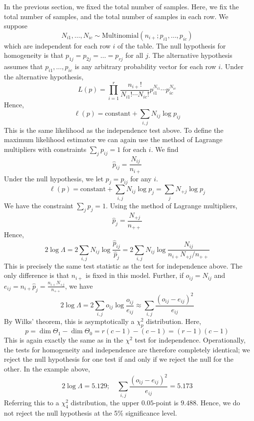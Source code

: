 \begin{example}
	In the previous section, we fixed the total number of samples.
	Here, we fix the total number of samples, and the total number of samples in each row.
	We suppose
	\[
		N_{i1}, \dots, N_{ic} \sim \mathrm{Multinomial}(n_{i+}; p_{i1}, \dots, p_{ic})
	\]
	which are independent for each row \( i \) of the table.
	The null hypothesis for homogeneity is that \( p_{1j} = p_{2j} = \dots = p_{rj} \) for all \( j \).
	The alternative hypothesis assumes that \( p_{i1}, \dots, p_{ic} \) is any arbitrary probability vector for each row \( i \).
	Under the alternative hypothesis,
	\[
		L(p) = \prod_{i=1}^r \frac{n_{i+}!}{N_{i1}!
			\cdots N_{ic}!} p_{i1}^{N_{i1}} \cdots p_{ic}^{N_{ic}}
	\]
	Hence,
	\[
		\ell(p) = \text{constant} + \sum_{i,j} N_{ij} \log p_{ij}
	\]
	This is the same likelihood as the independence test above.
	To define the maximum likelihood estimator we can again use the method of Lagrange multipliers with constraints \( \sum_j p_{ij} = 1 \) for each \( i \).
	We find
	\[
		\hat p_{ij} = \frac{N_{ij}}{n_{i+}}
	\]
	Under the null hypothesis, we let \( p_j = p_{ij} \) for any \( i \).
	\[
		\ell(p) = \text{constant} + \sum_{i,j} N_{ij} \log p_j = \sum_j N_{+j} \log p_j
	\]
	We have the constraint \( \sum_j p_j = 1 \).
	Using the method of Lagrange multipliers,
	\[
		\hat p_j = \frac{N_{+j}}{n_{++}}
	\]
	Hence,
	\[
		2 \log \Lambda = 2 \sum_{i,j} N_{ij} \log \frac{\hat p_{ij}}{\hat p_j} = 2 \sum_{i,j} N_{ij} \log \frac{N_{ij}}{n_{i+} N_{+j} / n_{++}}
	\]
	This is precisely the same test statistic as the test for independence above.
	The only difference is that \( n_{i+} \) is fixed in this model.
	Further, if \( o_{ij} = N_{ij} \) and \( e_{ij} = n_{i+} \hat p_j = \frac{n_{i+} N_{+j}}{n_{++}} \), we have
	\[
		2 \log \Lambda = 2 \sum_{i,j} o_{ij} \log \frac{o_{ij}}{e_{ij}} \approx \sum_{i,j} \frac{(o_{ij} - e_{ij})^2}{e_{ij}}
	\]
	By Wilks' theorem, this is asymptotically a \( \chi^2_p \) distribution.
	Here,
	\[
		p = \dim \Theta_1 - \dim \Theta_0 = r(c-1) - (c-1) = (r-1)(c-1)
	\]
	This is again exactly the same as in the \( \chi^2 \) test for independence.
	Operationally, the tests for homogeneity and independence are therefore completely identical; we reject the null hypothesis for one test if and only if we reject the null for the other.
	In the example above,
	\[
		2 \log \Lambda = 5.129;\quad \sum_{i,j} \frac{(o_{ij} - e_{ij})^2}{e_{ij}} = 5.173
	\]
	Referring this to a \( \chi^2_4 \) distribution, the upper \( 0.05 \)-point is \( 9.488 \).
	Hence, we do not reject the null hypothesis at the 5\% significance level.
\end{example}

